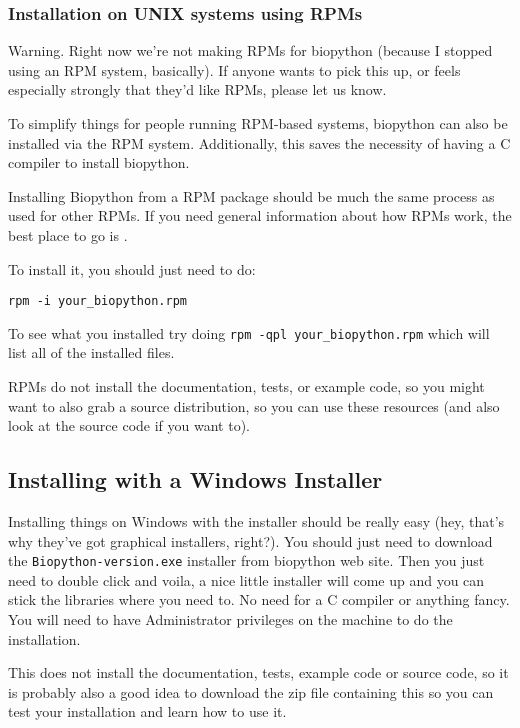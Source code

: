 \documentclass{article}
\begin{document}
\subsubsection{Installation on UNIX systems using RPMs}

Warning. Right now we're not making RPMs for biopython (because I
stopped using an RPM system, basically). If anyone wants to pick this
up, or feels especially strongly that they'd like RPMs, please let us
know.

To simplify things for people running RPM-based systems, biopython can
also be installed via the RPM system. Additionally, this saves the 
necessity of having a C compiler to install biopython. 

Installing Biopython from a RPM package should be much the same process as used for other RPMs. If you need general information about how RPMs work, the best place to go is .

To install it, you should just need to do:

\begin{verbatim}
rpm -i your_biopython.rpm
\end{verbatim}

To see what you installed try doing \verb|rpm -qpl your_biopython.rpm| which will list all of the installed files.

RPMs do not install the documentation, tests, or example code, so you might want to also grab a source distribution, so you can use these resources (and also look at the source code if you want to).

\subsection{Installing with a Windows Installer}

Installing things on Windows with the installer should be really easy (hey, that's why they've got graphical installers, right?). You should just need to download the \verb|Biopython-version.exe| installer from biopython web site. Then you just need to double click and voila, a nice little installer will come up and you can stick the libraries where you need to. No need for a C compiler or anything fancy. You will need to have Administrator privileges on the machine to do the installation.

This does not install the documentation, tests, example code or source code, so it is probably also a good idea to download the zip file containing this so you can test your installation and learn how to use it.
\end{document}
